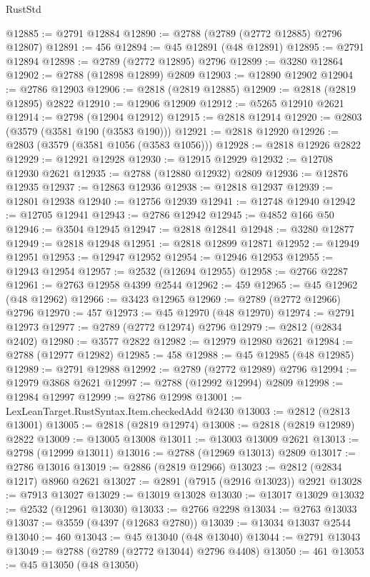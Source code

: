 \begin{lexlean}{RustStd}
\begin{coremodule}
@12885 := @2791 @12884
@12890 := @2788 (@2789 (@2772 @12885) @2796 @12807)
@12891 := 456
@12894 := @45 @12891 (@48 @12891)
@12895 := @2791 @12894
@12898 := @2789 (@2772 @12895) @2796
@12899 := @3280 @12864
@12902 := @2788 (@12898 @12899) @2809
@12903 := @12890 @12902
@12904 := @2786 @12903
@12906 := @2818 (@2819 @12885)
@12909 := @2818 (@2819 @12895) @2822
@12910 := @12906 @12909
@12912 := @5265 @12910 @2621
@12914 := @2798 (@12904 @12912)
@12915 := @2818 @12914
@12920 := @2803 (@3579 (@3581 @190 (@3583 @190)))
@12921 := @2818 @12920
@12926 := @2803 (@3579 (@3581 @1056 (@3583 @1056)))
@12928 := @2818 @12926 @2822
@12929 := @12921 @12928
@12930 := @12915 @12929
@12932 := @12708 @12930 @2621
@12935 := @2788 (@12880 @12932) @2809
@12936 := @12876 @12935
@12937 := @12863 @12936
@12938 := @12818 @12937
@12939 := @12801 @12938
@12940 := @12756 @12939
@12941 := @12748 @12940
@12942 := @12705 @12941
@12943 := @2786 @12942
@12945 := @4852 @166 @50
@12946 := @3504 @12945
@12947 := @2818 @12841
@12948 := @3280 @12877
@12949 := @2818 @12948
@12951 := @2818 @12899 @12871
@12952 := @12949 @12951
@12953 := @12947 @12952
@12954 := @12946 @12953
@12955 := @12943 @12954
@12957 := @2532 (@12694 @12955)
@12958 := @2766 @2287
@12961 := @2763 @12958 @4399 @2544
@12962 := 459
@12965 := @45 @12962 (@48 @12962)
@12966 := @3423 @12965
@12969 := @2789 (@2772 @12966) @2796
@12970 := 457
@12973 := @45 @12970 (@48 @12970)
@12974 := @2791 @12973
@12977 := @2789 (@2772 @12974) @2796
@12979 := @2812 (@2834 @2402)
@12980 := @3577 @2822
@12982 := @12979 @12980 @2621
@12984 := @2788 (@12977 @12982)
@12985 := 458
@12988 := @45 @12985 (@48 @12985)
@12989 := @2791 @12988
@12992 := @2789 (@2772 @12989) @2796
@12994 := @12979 @3868 @2621
@12997 := @2788 (@12992 @12994) @2809
@12998 := @12984 @12997
@12999 := @2786 @12998
@13001 := LexLeanTarget.RustSyntax.Item.checkedAdd @2430
@13003 := @2812 (@2813 @13001)
@13005 := @2818 (@2819 @12974)
@13008 := @2818 (@2819 @12989) @2822
@13009 := @13005 @13008
@13011 := @13003 @13009 @2621
@13013 := @2798 (@12999 @13011)
@13016 := @2788 (@12969 @13013) @2809
@13017 := @2786 @13016
@13019 := @2886 (@2819 @12966)
@13023 := @2812 (@2834 @1217) @8960 @2621
@13027 := @2891 (@7915 (@2916 @13023)) @2921
@13028 := @7913 @13027
@13029 := @13019 @13028
@13030 := @13017 @13029
@13032 := @2532 (@12961 @13030)
@13033 := @2766 @2298
@13034 := @2763 @13033
@13037 := @3559 (@4397 (@12683 @2780))
@13039 := @13034 @13037 @2544
@13040 := 460
@13043 := @45 @13040 (@48 @13040)
@13044 := @2791 @13043
@13049 := @2788 (@2789 (@2772 @13044) @2796 @4408)
@13050 := 461
@13053 := @45 @13050 (@48 @13050)

\end{coremodule}
\end{lexlean}
